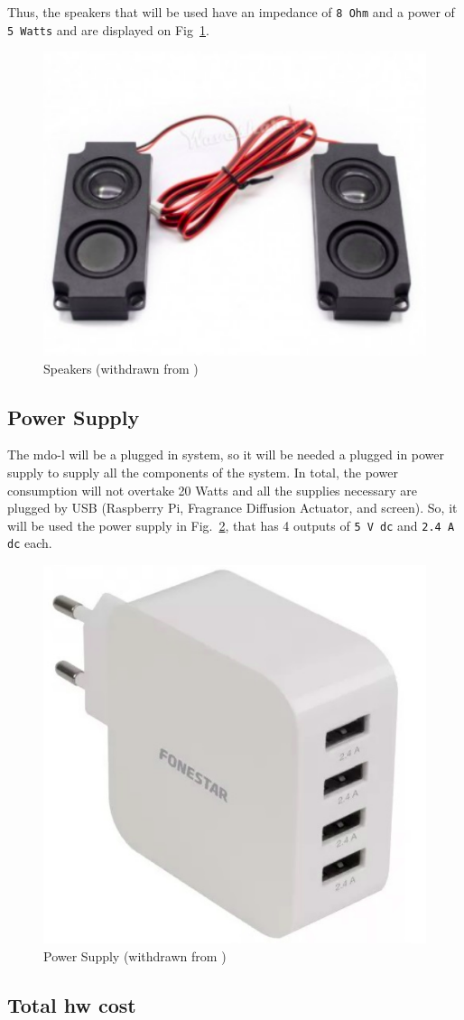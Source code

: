 Thus, the speakers that will be used have an impedance of \texttt{8 Ohm} and a power of \texttt{5 Watts} and are displayed on Fig~\ref{fig:speakers}.
%
\begin{figure}[htb!]
\centering
    \includegraphics[width=0.4\columnwidth]{./img/speakers.png}
  \caption{Speakers (withdrawn from \cite{speakers})}%
\label{fig:speakers}
\end{figure}

\subsection{Power Supply}

The \gls{mdo-l} will be a plugged in system, so it will be needed a plugged in power supply to supply all the components of the system. In total, the power consumption will not overtake 20 Watts and all the supplies necessary are plugged by USB (Raspberry Pi, Fragrance Diffusion Actuator, and screen). So, it will be used the power supply in Fig.~\ref{fig:power-supply}, that has 4 outputs of \texttt{5 V \gls{dc}} and \texttt{2.4 A \gls{dc}} each.
%
\begin{figure}[htb!]
\centering
    \includegraphics[width=0.4\columnwidth]{./img/power-supply.png}
  \caption{Power Supply (withdrawn from \cite{power-supply})}%
\label{fig:power-supply}
\end{figure}

\subsection{Total \gls{hw} cost}


